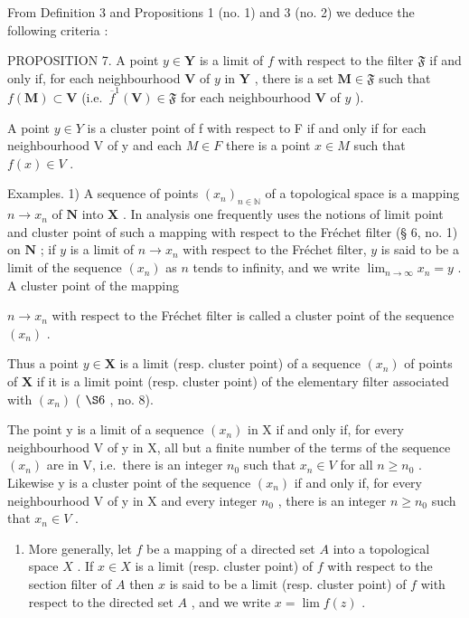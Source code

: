 From Definition 3 and Propositions 1 (no. 1) and 3 (no. 2) we deduce the following criteria :

PROPOSITION 7. A point \(y \in \mathbf{Y}\) is a limit of \(f\) with respect to the filter \(\mathfrak{F}\) if and only if, for each neighbourhood \(\mathbf{V}\) of \(y\) in \(\mathbf{Y}\) , there is a set \(\mathbf{M} \in \mathfrak{F}\) such that \(f(\mathbf{M}) \subset \mathbf{V}\) (i.e.~\(\overline{f}^{1}(\mathbf{V}) \in \mathfrak{F}\) for each neighbourhood \(\mathbf{V}\) of \(y\) ).

A point \(y \in Y\) is a cluster point of f with respect to F if and only if for each neighbourhood V of y and each \(M \in F\) there is a point \(x \in M\) such that \(f(x) \in V\) .

Examples. 1) A sequence of points \((x_{n})_{n\in \mathbb{N}}\) of a topological space is a mapping \(n\to x_n\) of \(\mathbf{N}\) into \(\mathbf{X}\) . In analysis one frequently uses the notions of limit point and cluster point of such a mapping with respect to the Fréchet filter (§ 6, no. 1) on \(\mathbf{N}\) ; if \(y\) is a limit of \(n\to x_{n}\) with respect to the Fréchet filter, \(y\) is said to be a limit of the sequence \((x_{n})\) as \(n\) tends to infinity, and we write \(\lim_{n\to \infty}x_n = y\) . A cluster point of the mapping

\(n \to x_{n}\) with respect to the Fréchet filter is called a cluster point of the sequence \((x_{n})\) .

Thus a point \(y \in \mathbf{X}\) is a limit (resp. cluster point) of a sequence \((x_n)\) of points of \(\mathbf{X}\) if it is a limit point (resp. cluster point) of the elementary filter associated with \((x_n)\) ( \(\S 6\) , no. 8).

The point y is a limit of a sequence \((x_{n})\) in X if and only if, for every neighbourhood V of y in X, all but a finite number of the terms of the sequence \((x_{n})\) are in V, i.e.~there is an integer \(n_{0}\) such that \(x_{n} \in V\) for all \(n \geqslant n_{0}\) . Likewise y is a cluster point of the sequence \((x_{n})\) if and only if, for every neighbourhood V of y in X and every integer \(n_{0}\) , there is an integer \(n \geqslant n_{0}\) such that \(x_{n} \in V\) .

\begin{enumerate}
\def\labelenumi{\arabic{enumi})}
\setcounter{enumi}{1}
\tightlist
\item
  More generally, let \(f\) be a mapping of a directed set \(A\) into a topological space \(X\) . If \(x \in X\) is a limit (resp. cluster point) of \(f\) with respect to the section filter of \(A\) then \(x\) is said to be a limit (resp. cluster point) of \(f\) with respect to the directed set \(A\) , and we write \(x = \lim f(z)\) .
\end{enumerate}

